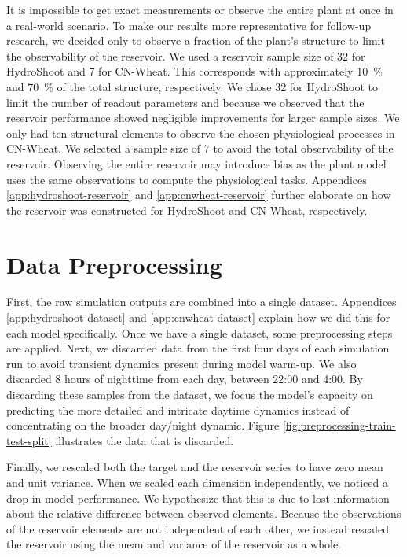 It is impossible to get exact measurements or observe the entire plant at once in a real-world scenario.
To make our results more representative for follow-up research, we decided only to observe a fraction of the plant's structure to limit the observability of the reservoir.
We used a reservoir sample size of 32 for HydroShoot and 7 for CN-Wheat. 
This corresponds with approximately \SI{10}{\percent} and \SI{70}{\percent} of the total structure, respectively.
We chose 32 for HydroShoot to limit the number of readout parameters and because we observed that the reservoir performance showed negligible improvements for larger sample sizes.
We only had ten structural elements to observe the chosen physiological processes in CN-Wheat. 
We selected a sample size of 7 to avoid the total observability of the reservoir.
Observing the entire reservoir may introduce bias as the plant model uses the same observations to compute the physiological tasks.
Appendices \ref{app:hydroshoot-reservoir} and \ref{app:cnwheat-reservoir} further elaborate on how the reservoir was constructed for HydroShoot and CN-Wheat, respectively.


\section{Data Preprocessing} \label{sec:data-preprocessing}

First, the raw simulation outputs are combined into a single dataset. Appendices \ref{app:hydroshoot-dataset} and \ref{app:cnwheat-dataset} explain how we did this for each model specifically.
Once we have a single dataset, some preprocessing steps are applied.
Next, we discarded data from the first four days of each simulation run to avoid transient dynamics present during model warm-up.
We also discarded 8 hours of nighttime from each day, between 22:00 and 4:00.
By discarding these samples from the dataset, we focus the model's capacity on predicting the more detailed and intricate daytime dynamics instead of concentrating on the broader day/night dynamic.
Figure \ref{fig:preprocessing-train-test-split} illustrates the data that is discarded.

Finally, we rescaled both the target and the reservoir series to have zero mean and unit variance.
When we scaled each dimension independently, we noticed a drop in model performance.
We hypothesize that this is due to lost information about the relative difference between observed elements.
Because the observations of the reservoir elements are not independent of each other, we instead rescaled the reservoir using the mean and variance of the reservoir as a whole.

